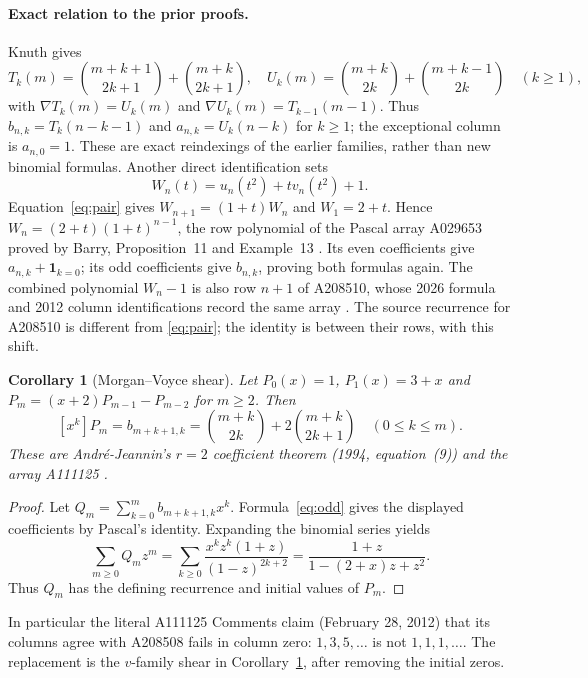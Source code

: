 \documentclass[11pt]{article}
\newtheorem{corollary}[theorem]{Corollary}
\begin{document}
\paragraph{Exact relation to the prior proofs.}
Knuth \cite[pp.~285--286]{knuth} gives
\[
T_k(m)=\binom{m+k+1}{2k+1}+\binom{m+k}{2k+1},\quad
U_k(m)=\binom{m+k}{2k}+\binom{m+k-1}{2k}\quad(k\geq1),
\]
with $\nabla T_k(m)=U_k(m)$ and
$\nabla U_k(m)=T_{k-1}(m-1)$. Thus
$b_{n,k}=T_k(n-k-1)$ and $a_{n,k}=U_k(n-k)$ for $k\geq1$;
the exceptional column is $a_{n,0}=1$. These are exact reindexings of
the earlier families, rather than new binomial formulas.
Another direct identification sets
\[
W_n(t)=u_n(t^2)+t v_n(t^2)+1.
\]
Equation~\eqref{eq:pair} gives $W_{n+1}=(1+t)W_n$ and $W_1=2+t$.
Hence $W_n=(2+t)(1+t)^{n-1}$, the row polynomial of the
Pascal array A029653 proved by Barry, Proposition~11 and Example~13
\cite{barry}. Its even coefficients give $a_{n,k}+\mathbf1_{k=0}$;
its odd coefficients give $b_{n,k}$, proving both formulas again.
The combined polynomial $W_n-1$ is also row $n+1$ of A208510, whose
2026 formula and 2012 column identifications record the same array
\cite{related-arrays}. The source recurrence for A208510 is different
from \eqref{eq:pair}; the identity is between their rows, with this shift.

\begin{corollary}[Morgan--Voyce shear]\label{cor:morgan}
Let $P_0(x)=1$, $P_1(x)=3+x$ and
$P_m=(x+2)P_{m-1}-P_{m-2}$ for $m\geq2$. Then
\[
[x^k]P_m=b_{m+k+1,k}
=\binom{m+k}{2k}+2\binom{m+k}{2k+1}\quad(0\leq k\leq m).
\]
These are Andr\'e-Jeannin's $r=2$ coefficient theorem (1994,
equation~(9)) and the array A111125 \cite{andre,related-arrays}.
\end{corollary}
\begin{proof}
Let $Q_m=\sum_{k=0}^m b_{m+k+1,k}x^k$. Formula~\eqref{eq:odd} gives
the displayed coefficients by Pascal's identity. Expanding the binomial
series yields
\[
\sum_{m\geq0}Q_mz^m
=\sum_{k\geq0}\frac{x^kz^k(1+z)}{(1-z)^{2k+2}}
=\frac{1+z}{1-(2+x)z+z^2}.
\]
Thus $Q_m$ has the defining recurrence and initial values of $P_m$.
\end{proof}
In particular the literal A111125 Comments claim (February 28, 2012)
that its columns agree with A208508 fails in column zero: $1,3,5,\ldots$
is not $1,1,1,\ldots$. The replacement is the $v$-family shear in
Corollary~\ref{cor:morgan}, after removing the initial zeros.
\end{document}
